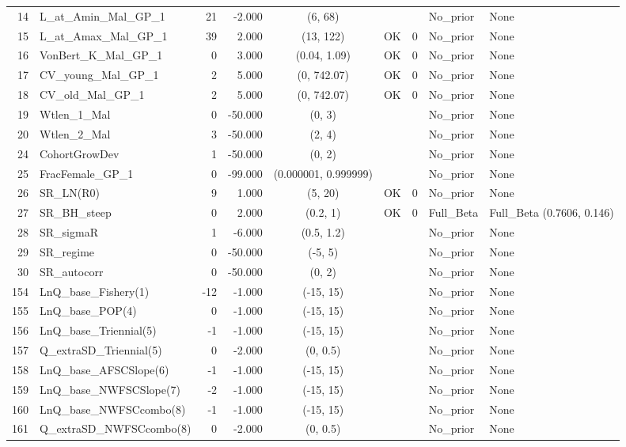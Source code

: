 \documentclass[12pt,]{article}
\begin{document}
\begin{landscape}
\begin{longtable}{rlrrcccll}
  14 & L\_at\_Amin\_Mal\_GP\_1 & 21 & -2.000 & (6, 68) &  &  & No\_prior & None \\ 
  15 & L\_at\_Amax\_Mal\_GP\_1 & 39 & 2.000 & (13, 122) & OK & 0 & No\_prior & None \\ 
  16 & VonBert\_K\_Mal\_GP\_1 & 0 & 3.000 & (0.04, 1.09) & OK & 0 & No\_prior & None \\ 
  17 & CV\_young\_Mal\_GP\_1 & 2 & 5.000 & (0, 742.07) & OK & 0 & No\_prior & None \\ 
  18 & CV\_old\_Mal\_GP\_1 & 2 & 5.000 & (0, 742.07) & OK & 0 & No\_prior & None \\ 
  19 & Wtlen\_1\_Mal & 0 & -50.000 & (0, 3) &  &  & No\_prior & None \\ 
  20 & Wtlen\_2\_Mal & 3 & -50.000 & (2, 4) &  &  & No\_prior & None \\ 
  24 & CohortGrowDev & 1 & -50.000 & (0, 2) &  &  & No\_prior & None \\ 
  25 & FracFemale\_GP\_1 & 0 & -99.000 & (0.000001, 0.999999) &  &  & No\_prior & None \\ 
  26 & SR\_LN(R0) & 9 & 1.000 & (5, 20) & OK & 0 & No\_prior & None \\ 
  27 & SR\_BH\_steep & 0 & 2.000 & (0.2, 1) & OK & 0 & Full\_Beta & Full\_Beta (0.7606, 0.146) \\ 
  28 & SR\_sigmaR & 1 & -6.000 & (0.5, 1.2) &  &  & No\_prior & None \\ 
  29 & SR\_regime & 0 & -50.000 & (-5, 5) &  &  & No\_prior & None \\ 
  30 & SR\_autocorr & 0 & -50.000 & (0, 2) &  &  & No\_prior & None \\ 
  154 & LnQ\_base\_Fishery(1) & -12 & -1.000 & (-15, 15) &  &  & No\_prior & None \\ 
  155 & LnQ\_base\_POP(4) & 0 & -1.000 & (-15, 15) &  &  & No\_prior & None \\ 
  156 & LnQ\_base\_Triennial(5) & -1 & -1.000 & (-15, 15) &  &  & No\_prior & None \\ 
  157 & Q\_extraSD\_Triennial(5) & 0 & -2.000 & (0, 0.5) &  &  & No\_prior & None \\ 
  158 & LnQ\_base\_AFSCSlope(6) & -1 & -1.000 & (-15, 15) &  &  & No\_prior & None \\ 
  159 & LnQ\_base\_NWFSCSlope(7) & -2 & -1.000 & (-15, 15) &  &  & No\_prior & None \\ 
  160 & LnQ\_base\_NWFSCcombo(8) & -1 & -1.000 & (-15, 15) &  &  & No\_prior & None \\ 
  161 & Q\_extraSD\_NWFSCcombo(8) & 0 & -2.000 & (0, 0.5) &  &  & No\_prior & None \\ 

\end{longtable}
\end{landscape}
\end{document}
